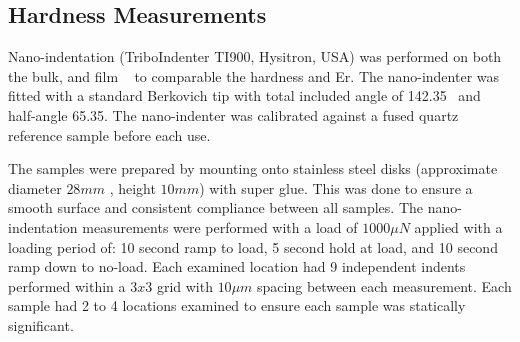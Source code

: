 \subsection{Hardness Measurements}
Nano-indentation (TriboIndenter TI900, Hysitron, USA) was performed on both the bulk, and film \MgZnCa~ to comparable the hardness and \gls{Er}. The nano-indenter was fitted with a standard Berkovich tip with total included angle of 142.35\degree~ and half-angle 65.35\degree. The nano-indenter was calibrated against a fused quartz reference sample before each use.   

The samples were prepared by mounting onto stainless steel disks (approximate diameter $28mm$ , height $10mm$) with super glue. This was done to ensure a smooth surface and consistent compliance between all samples. The nano-indentation measurements were performed with a load of $1000 \mu N$ applied with a loading period of: 10 second ramp to load, 5 second hold at load, and 10 second ramp down to no-load. Each examined location had 9 independent indents performed within a $3 x 3$ grid with $10 \mu m$ spacing between each measurement. Each sample had 2 to 4 locations examined to ensure each sample was statically significant.  

